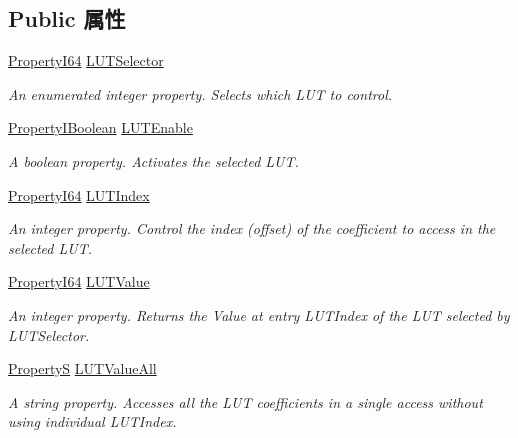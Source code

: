 \subsection*{Public 属性}
\begin{DoxyCompactItemize}
\item 
\hyperlink{group___common_interface_ga81749b2696755513663492664a18a893}{Property\+I64} \hyperlink{classmv_i_m_p_a_c_t_1_1acquire_1_1_gen_i_cam_1_1_l_u_t_control_a7be4476d2a3e5d5b9f54976500ec72e9}{L\+U\+T\+Selector}
\begin{DoxyCompactList}\small\item\em An enumerated integer property. Selects which L\+U\+T to control. \end{DoxyCompactList}\item 
\hyperlink{group___common_interface_ga44f9437e24b21b6c93da9039ec6786aa}{Property\+I\+Boolean} \hyperlink{classmv_i_m_p_a_c_t_1_1acquire_1_1_gen_i_cam_1_1_l_u_t_control_adab0df30581a5d6d09b56b665dc4c85a}{L\+U\+T\+Enable}
\begin{DoxyCompactList}\small\item\em A boolean property. Activates the selected L\+U\+T. \end{DoxyCompactList}\item 
\hyperlink{group___common_interface_ga81749b2696755513663492664a18a893}{Property\+I64} \hyperlink{classmv_i_m_p_a_c_t_1_1acquire_1_1_gen_i_cam_1_1_l_u_t_control_a884671c2be5384d266a2f8f0bb3ff2d3}{L\+U\+T\+Index}
\begin{DoxyCompactList}\small\item\em An integer property. Control the index (offset) of the coefficient to access in the selected L\+U\+T. \end{DoxyCompactList}\item 
\hyperlink{group___common_interface_ga81749b2696755513663492664a18a893}{Property\+I64} \hyperlink{classmv_i_m_p_a_c_t_1_1acquire_1_1_gen_i_cam_1_1_l_u_t_control_a8bd649d5ecfe16c0cf07c78901703c40}{L\+U\+T\+Value}
\begin{DoxyCompactList}\small\item\em An integer property. Returns the Value at entry L\+U\+T\+Index of the L\+U\+T selected by L\+U\+T\+Selector. \end{DoxyCompactList}\item 
\hyperlink{classmv_i_m_p_a_c_t_1_1acquire_1_1_property_s}{Property\+S} \hyperlink{classmv_i_m_p_a_c_t_1_1acquire_1_1_gen_i_cam_1_1_l_u_t_control_ad8ec09121431e07567ddb3efb30230cb}{L\+U\+T\+Value\+All}
\begin{DoxyCompactList}\small\item\em A string property. Accesses all the L\+U\+T coefficients in a single access without using individual L\+U\+T\+Index. \end{DoxyCompactList}\end{DoxyCompactItemize}


